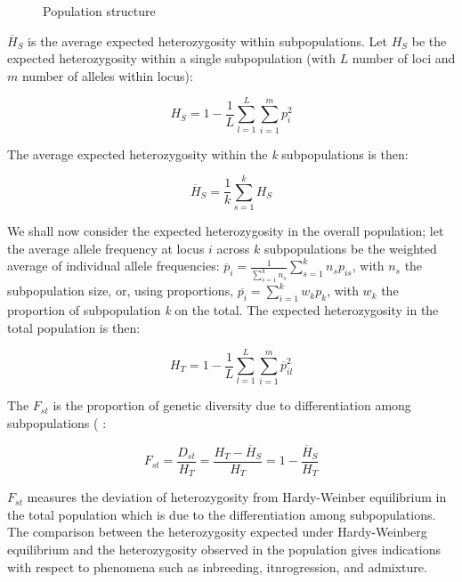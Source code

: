 \documentclass{bmcart}
\def\texttt{[image: ]}
\begin{document}
\begin{figure}
\centering
\texttt{[image: Fst.png]}
\caption{Population structure \label{fig:fst} }
\end{figure}

$\overline{H}_S$ is the average expected heterozygosity within
subpopulations. Let $H_S$ be the expected heterozygosity within a single
subpopulation (with $L$ number of loci and $m$ number of alleles within locus): 

\begin{equation}
H_S=1-\frac{1}{L}\sum_{l=1}^L\sum_{i=1}^{m} p_i^2
\end{equation}

The average expected heterozygosity within the \emph{k} subpopulations is then:

\begin{equation}
\overline{H}_S=\frac{1}{k}\sum_{s=1}^k H_S
\end{equation} 

We shall now consider the expected heterozygosity in the overall
population; let the average allele frequency at locus $i$ across $k$
subpopulations be the
weighted average of individual allele frequencies:
$\overline{p}_i=\frac{1}{\sum_{s=1}^kn_s}\sum_{s=1}^k n_s p_{is}$, with
$n_s$ the subpopulation size, or, using proportions,
$\overline{p_i}=\sum_{i=1}^k w_k p_k$, with $w_k$ the proportion of
subpopulation \emph{k} on the total. The
expected heterozygosity in the total population is then:

\begin{equation}
H_T=1-\frac{1}{L}\sum_{l=1}^L \sum_{i=1}^m \overline{p}_{il}^2  
\end{equation}

The $F_{st}$ is the proportion of genetic diversity due to
differentiation among subpopulations ( \cite{nei1977f}:

\begin{equation} \label{eq:fstnei}
F_{st}=\frac{D_{st}}{H_T}=\frac{H_T-\overline{H}_S}{H_T}=1-\frac{\overline{H}_S}{H_T}  
\end{equation}

$F_{st}$ measures the deviation of heterozygosity from Hardy-Weinber
equilibrium in the total population which is due to the differentiation
among subpopulations.
The comparison between the heterozygosity expected under Hardy-Weinberg
equilibrium and the heterozygosity observed in the population gives indications with respect
to phenomena such as inbreeding, itnrogression, and admixture.
\end{document}
